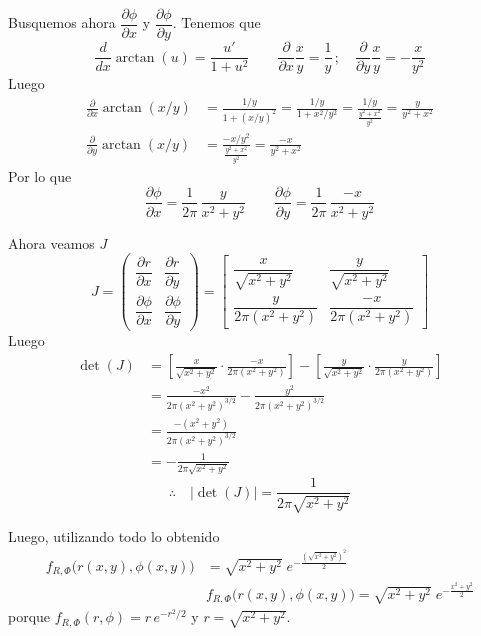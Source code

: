 \documentclass[9pt]{extarticle}
\begin{document}
Busquemos ahora $\dfrac{\partial\phi}{\partial x}$ y $\dfrac{\partial\phi}{\partial y}$. Tenemos que
\[
\frac{d}{dx}\arctan(u) = \frac{u'}{1+u^2}
\qquad
\frac{\partial}{\partial x}\frac{x}{y} = \frac{1}{y}\,;\quad
\frac{\partial}{\partial y}\frac{x}{y} = -\frac{x}{y^2}
\]
Luego
\begin{align*}
\frac{\partial}{\partial x}\arctan(x/y)
&= \frac{1/y}{1+(x/y)^2} = \frac{1/y}{1+x^2/y^2}
= \frac{1/y}{\frac{y^2+x^2}{y^2}} = \frac{y}{y^2+x^2}\\
\frac{\partial}{\partial y}\arctan(x/y)
&= \frac{-x/y^2}{\frac{y^2+x^2}{y^2}} = \frac{-x}{y^2+x^2}
\end{align*}
Por lo que
\[
\boxed{\frac{\partial\phi}{\partial x} = \frac{1}{2\pi}\,\frac{y}{x^2+y^2}}
\qquad
\boxed{\frac{\partial\phi}{\partial y} = \frac{1}{2\pi}\,\frac{-x}{x^2+y^2}}
\]

Ahora veamos $J$
\[
J = \begin{pmatrix}
\dfrac{\partial r}{\partial x} & \dfrac{\partial r}{\partial y}\\[2ex]
\dfrac{\partial \phi}{\partial x} & \dfrac{\partial \phi}{\partial y}
\end{pmatrix}
= \begin{bmatrix}
\dfrac{x}{\sqrt{x^2+y^2}} & \dfrac{y}{\sqrt{x^2+y^2}}\\[2ex]
\dfrac{y}{2\pi(x^2+y^2)} & \dfrac{-x}{2\pi(x^2+y^2)}
\end{bmatrix}
\]
Luego
\begin{align*}
\det(J) &= \left[\frac{x}{\sqrt{x^2+y^2}}\cdot\frac{-x}{2\pi(x^2+y^2)}\right]
- \left[\frac{y}{\sqrt{x^2+y^2}}\cdot\frac{y}{2\pi(x^2+y^2)}\right]\\
&= \frac{-x^2}{2\pi(x^2+y^2)^{3/2}} - \frac{y^2}{2\pi(x^2+y^2)^{3/2}}\\
&= \frac{-(x^2+y^2)}{2\pi(x^2+y^2)^{3/2}}\\
&= -\frac{1}{2\pi\sqrt{x^2+y^2}}
\end{align*}
\[
\therefore\quad \boxed{\lvert\det(J)\rvert = \frac{1}{2\pi\sqrt{x^2+y^2}}}
\]

Luego, utilizando todo lo obtenido
\begin{align*}
f_{R,\Phi}\bigl(r(x,y),\phi(x,y)\bigr) &= \sqrt{x^2+y^2}\;e^{-\frac{\left(\sqrt{x^2+y^2}\right)^2}{2}}\\
&\boxed{f_{R,\Phi}\bigl(r(x,y),\phi(x,y)\bigr) = \sqrt{x^2+y^2}\;e^{-\frac{x^2+y^2}{2}}}
\end{align*}
porque $f_{R,\Phi}(r,\phi) = r\,e^{-r^2/2}$ y $r=\sqrt{x^2+y^2}$.
\end{document}
